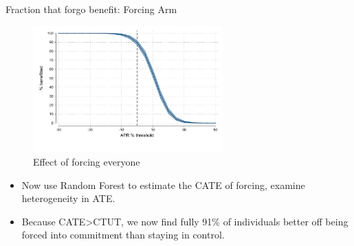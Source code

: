 \documentclass[8pt]{beamer}
\begin{document}
\begin{frame}{Fraction that forgo benefit:  Forcing Arm}


   
    
        \begin{figure}
         \label{better_forceall}
        \caption{Effect of forcing everyone}
        \centering
        \includegraphics[width=0.65\textwidth]{Figuras/cdf_CATE.pdf}
        \end{figure}

\begin{itemize}
    \item   Now use Random Forest to estimate the CATE of forcing, examine heterogeneity in ATE.
    \item   Because CATE>CTUT, we now find fully 91\% of individuals better off being forced into commitment than staying in control.
\end{itemize}        


\end{frame}
\end{document}
